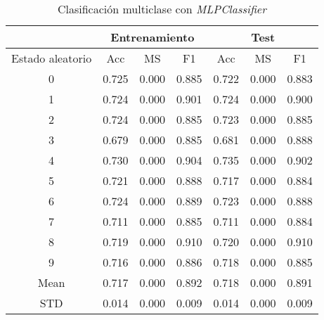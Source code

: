 \begin{table}[th]
	\centering
	\begin{tabular}{ |c|c|c|c|c|c|c| }
		\hline
		\rowcolor{LightCyan}
		 & \multicolumn{3}{c|}{Entrenamiento} & \multicolumn{3}{c|}{Test} \\
		\hline
		\rowcolor{LightCyan}
		 Estado aleatorio & Acc & MS & F1 & Acc & MS & F1 \\
		\hline
		0 & 0.725 & 0.000 & 0.885 & 0.722 & 0.000 & 0.883 \\
		1 & 0.724 & 0.000 & 0.901 & 0.724 & 0.000 & 0.900 \\
		2 & 0.724 & 0.000 & 0.885 & 0.723 & 0.000 & 0.885 \\
		3 & 0.679 & 0.000 & 0.885 & 0.681 & 0.000 & 0.888 \\
		4 & 0.730 & 0.000 & 0.904 & 0.735 & 0.000 & 0.902 \\
		5 & 0.721 & 0.000 & 0.888 & 0.717 & 0.000 & 0.884 \\
		6 & 0.724 & 0.000 & 0.889 & 0.723 & 0.000 & 0.888 \\
		7 & 0.711 & 0.000 & 0.885 & 0.711 & 0.000 & 0.884 \\
		8 & 0.719 & 0.000 & 0.910 & 0.720 & 0.000 & 0.910 \\
		9 & 0.716 & 0.000 & 0.886 & 0.718 & 0.000 & 0.885 \\
		Mean & 0.717 & 0.000 & 0.892 & 0.718 & 0.000 & 0.891 \\
		STD & 0.014 & 0.000 & 0.009 & 0.014 & 0.000 & 0.009 \\
		\hline
	\end{tabular}
	\caption{Clasificación multiclase con \textit{MLPClassifier}}
	\label{tabla:mlp_multi}
\end{table}
